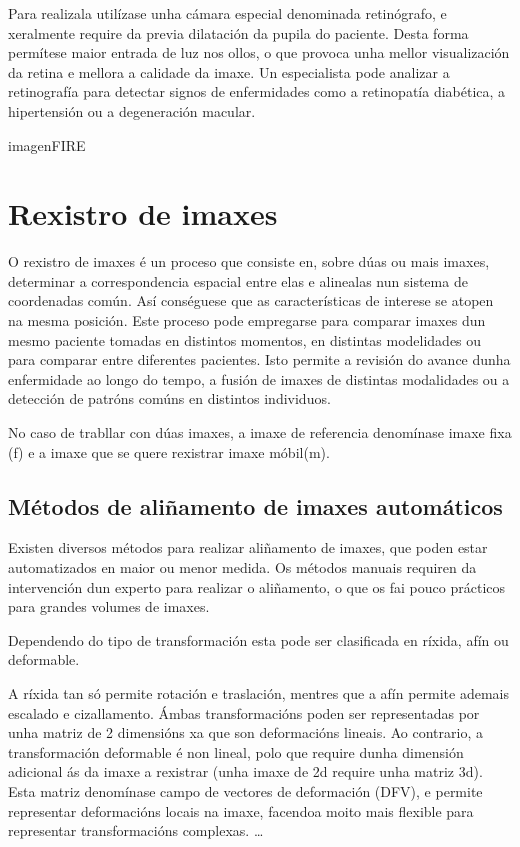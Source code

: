 Para realizala utilízase unha cámara especial denominada retinógrafo, e xeralmente require da previa dilatación da pupila do paciente.
Desta forma permítese maior entrada de luz nos ollos, o que provoca unha mellor visualización da retina e mellora a calidade da imaxe.
Un especialista pode analizar a retinografía para detectar signos de enfermidades como a retinopatía diabética, a hipertensión ou a degeneración macular.

imagenFIRE

\section{Rexistro de imaxes}
\label{sec:Rexistro de imaxes}
O rexistro de imaxes é un proceso que consiste en, sobre dúas ou mais imaxes, determinar a correspondencia espacial entre elas e alinealas nun sistema de coordenadas común.
Así conséguese que as características de interese se atopen na mesma posición.
Este proceso pode empregarse para comparar imaxes dun mesmo paciente tomadas en distintos momentos, en distintas modelidades ou para comparar entre diferentes pacientes.
Isto permite a revisión do avance dunha enfermidade ao longo do tempo, a fusión de imaxes de distintas modalidades ou a detección de patróns comúns en distintos individuos.

No caso de trabllar con dúas imaxes, a imaxe de referencia denomínase imaxe fixa (f) e a imaxe que se quere rexistrar imaxe móbil(m).

\subsection{Métodos de aliñamento de imaxes automáticos}
\label{subsec:Métodos de aliñamento de imaxes automáticos}
Existen diversos métodos para realizar aliñamento de imaxes, que poden estar automatizados en maior ou menor medida.
Os métodos manuais requiren da intervención dun experto para realizar o aliñamento, o que os fai pouco prácticos para grandes volumes de imaxes.

Dependendo do tipo de transformación esta pode ser clasificada en ríxida, afín ou deformable.

A ríxida tan só permite rotación e traslación, mentres que a afín permite ademais escalado e cizallamento.
Ámbas transformacións poden ser representadas por unha matriz de 2 dimensións xa que son deformacións lineais.
Ao contrario, a transformación deformable é non lineal, polo que require dunha dimensión adicional ás da imaxe a rexistrar (unha imaxe de 2d require unha matriz 3d).
Esta matriz denomínase campo de vectores de deformación (DFV), e permite representar deformacións locais na imaxe, facendoa moito mais flexible para representar transformacións complexas.
\dots

